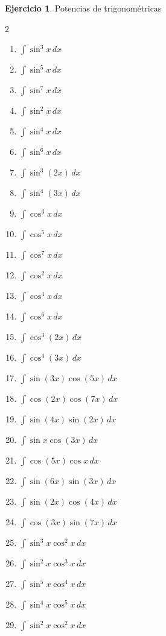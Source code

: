 \documentclass[12pt]{article}
\theoremstyle{definition}
\newtheorem{Ejer}[teorema]{Ejercicio}
\theoremstyle{remark}
\begin{document}
\begin{Ejer}{Potencias de trigonométricas}
\begin{multicols}{2}
\begin{enumerate}[resume=integrales]
\item $\displaystyle \int \sin^3 x\,dx$
\item $\displaystyle \int \sin^5 x\,dx$
\item $\displaystyle \int \sin^7 x\,dx$
\item $\displaystyle \int \sin^2 x\,dx$
\item $\displaystyle \int \sin^4 x\,dx$
\item $\displaystyle \int \sin^6 x\,dx$
\item $\displaystyle \int \sin^3(2x)\,dx$
\item $\displaystyle \int \sin^4(3x)\,dx$
\item $\displaystyle \int \cos^3 x\,dx$
\item $\displaystyle \int \cos^5 x\,dx$
\item $\displaystyle \int \cos^7 x\,dx$
\item $\displaystyle \int \cos^2 x\,dx$
\item $\displaystyle \int \cos^4 x\,dx$
\item $\displaystyle \int \cos^6 x\,dx$
\item $\displaystyle \int \cos^3(2x)\,dx$
\item $\displaystyle \int \cos^4(3x)\,dx$
\item $\displaystyle \int \sin(3x)\cos(5x)\,dx$
\item $\displaystyle \int \cos(2x)\cos(7x)\,dx$
\item $\displaystyle \int \sin(4x)\sin(2x)\,dx$
\item $\displaystyle \int \sin x\cos(3x)\,dx$
\item $\displaystyle \int \cos(5x)\cos x\,dx$
\item $\displaystyle \int \sin(6x)\sin(3x)\,dx$
\item $\displaystyle \int \sin(2x)\cos(4x)\,dx$
\item $\displaystyle \int \cos(3x)\sin(7x)\,dx$
\item $\displaystyle \int \sin^3 x\cos^2 x\,dx$
\item $\displaystyle \int \sin^2 x\cos^3 x\,dx$
\item $\displaystyle \int \sin^5 x\cos^4 x\,dx$
\item $\displaystyle \int \sin^4 x\cos^5 x\,dx$
\item $\displaystyle \int \sin^2 x\cos^2 x\,dx$

\end{enumerate}
\end{multicols}
\end{Ejer}
\end{document}
